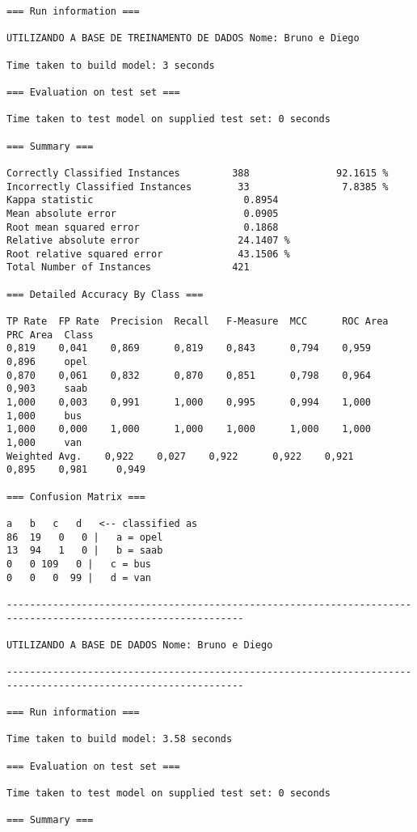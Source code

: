 \documentclass[
	article,			%
	11pt,				%
	oneside,			%
	a4paper,			%
	english,			%
	brazil,				%
	sumario=tradicional
	]{abntex2}
\begin{document}
\begin{lstlisting}
=== Run information ===

UTILIZANDO A BASE DE TREINAMENTO DE DADOS Nome: Bruno e Diego

Time taken to build model: 3 seconds

=== Evaluation on test set ===

Time taken to test model on supplied test set: 0 seconds

=== Summary ===

Correctly Classified Instances         388               92.1615 %
Incorrectly Classified Instances        33                7.8385 %
Kappa statistic                          0.8954
Mean absolute error                      0.0905
Root mean squared error                  0.1868
Relative absolute error                 24.1407 %
Root relative squared error             43.1506 %
Total Number of Instances              421     

=== Detailed Accuracy By Class ===

TP Rate  FP Rate  Precision  Recall   F-Measure  MCC      ROC Area  PRC Area  Class
0,819    0,041    0,869      0,819    0,843      0,794    0,959     0,896     opel
0,870    0,061    0,832      0,870    0,851      0,798    0,964     0,903     saab
1,000    0,003    0,991      1,000    0,995      0,994    1,000     1,000     bus
1,000    0,000    1,000      1,000    1,000      1,000    1,000     1,000     van
Weighted Avg.    0,922    0,027    0,922      0,922    0,921      0,895    0,981     0,949     

=== Confusion Matrix ===

a   b   c   d   <-- classified as
86  19   0   0 |   a = opel
13  94   1   0 |   b = saab
0   0 109   0 |   c = bus
0   0   0  99 |   d = van

---------------------------------------------------------------------------------------------------------------

UTILIZANDO A BASE DE DADOS Nome: Bruno e Diego

---------------------------------------------------------------------------------------------------------------

=== Run information ===

Time taken to build model: 3.58 seconds

=== Evaluation on test set ===

Time taken to test model on supplied test set: 0 seconds

=== Summary ===


\end{lstlisting}
\end{document}
